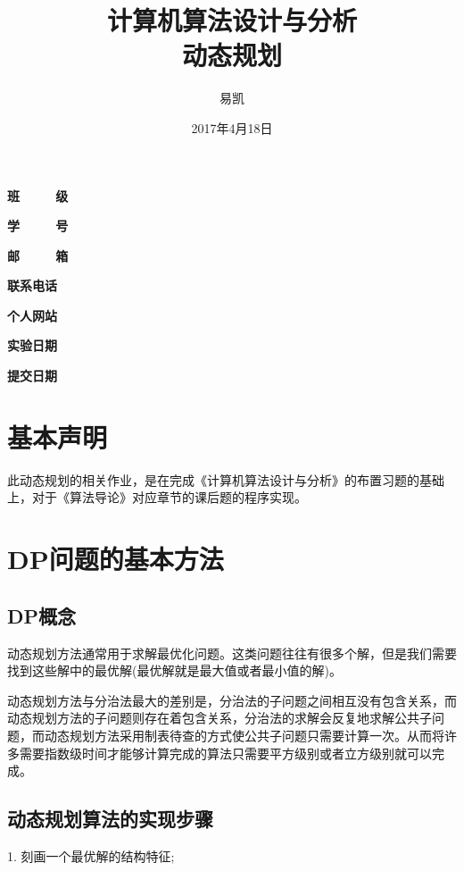 \documentclass[UTF8]{ctexart}
\title{\Huge{计算机算法设计与分析\\ 动态规划}}
\author{\Huge{易凯}}
\date{\Huge{2017年4月18日}}
\begin{document}
    \maketitle
    \vspace{35mm}
    \begin{flushright}
    \Large{
    \textbf{班\ \ \ \ \ 级} 

    \textbf{学\ \ \ \ \ 号} 

    \textbf{邮\ \ \ \ \ 箱} 

    \textbf{联系电话} 

    \textbf{个人网站} 


      \textbf{实验日期} 

    \textbf{提交日期} 
    }
    \end{flushright}
    
    \newpage
  	\tableofcontents
  	\newpage
  	\listoffigures
    \newpage
    
    \section{基本声明}
    此动态规划的相关作业，是在完成《计算机算法设计与分析》的布置习题的基础上，对于《算法导论》对应章节的课后题的程序实现。

    \section{DP问题的基本方法}
    \subsection{DP概念}
    动态规划方法通常用于求解最优化问题。这类问题往往有很多个解，但是我们需要找到这些解中的最优解(最优解就是最大值或者最小值的解)。

    动态规划方法与分治法最大的差别是，分治法的子问题之间相互没有包含关系，而动态规划方法的子问题则存在着包含关系，分治法的求解会反复地求解公共子问题，而动态规划方法采用制表待查的方式使公共子问题只需要计算一次。从而将许多需要指数级时间才能够计算完成的算法只需要平方级别或者立方级别就可以完成。

    \subsection{动态规划算法的实现步骤}
    1. 刻画一个最优解的结构特征;
\end{document}
